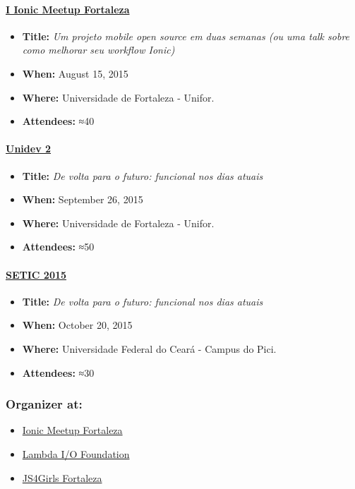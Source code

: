 \documentclass[]{article}
\providecommand{\tightlist}{%
  \setlength{\itemsep}{0pt}\setlength{\parskip}{0pt}}
\let\oldparagraph\paragraph
\renewcommand{\paragraph}[1]{\oldparagraph{#1}\mbox{}}
\begin{document}
\paragraph{\texorpdfstring{\href{http://www.meetup.com/pt/Ionic-Ceara/events/224620543/}{I
Ionic Meetup
Fortaleza}}{I Ionic Meetup Fortaleza}}\label{i-ionic-meetup-fortaleza}

\begin{itemize}
\tightlist
\item
  \textbf{Title:} \emph{Um projeto mobile open source em duas semanas
  (ou uma talk sobre como melhorar seu workflow Ionic)}
\item
  \textbf{When:} August 15, 2015
\item
  \textbf{Where:} Universidade de Fortaleza - Unifor.
\item
  \textbf{Attendees:} ≈40
\end{itemize}

\paragraph{\texorpdfstring{\href{http://unidevce.github.io/}{Unidev
2}}{Unidev 2}}\label{unidev-2}

\begin{itemize}
\tightlist
\item
  \textbf{Title:} \emph{De volta para o futuro: funcional nos dias
  atuais}
\item
  \textbf{When:} September 26, 2015
\item
  \textbf{Where:} Universidade de Fortaleza - Unifor.
\item
  \textbf{Attendees:} ≈50
\end{itemize}

\paragraph{\texorpdfstring{\href{http://www.seti.ufc.br/}{SETIC
2015}}{SETIC 2015}}\label{setic-2015}

\begin{itemize}
\tightlist
\item
  \textbf{Title:} \emph{De volta para o futuro: funcional nos dias
  atuais}
\item
  \textbf{When:} October 20, 2015
\item
  \textbf{Where:} Universidade Federal do Ceará - Campus do Pici.
\item
  \textbf{Attendees:} ≈30
\end{itemize}

\subsubsection{Organizer at:}\label{organizer-at}

\begin{itemize}
\tightlist
\item
  \href{http://ionicbrazil.com/}{Ionic Meetup Fortaleza}
\item
  \href{https://github.com/lambda-io}{Lambda I/O Foundation}
\item
  \href{http://js4girls-fortaleza.github.io/}{JS4Girls Fortaleza}
\end{itemize}
\end{document}
